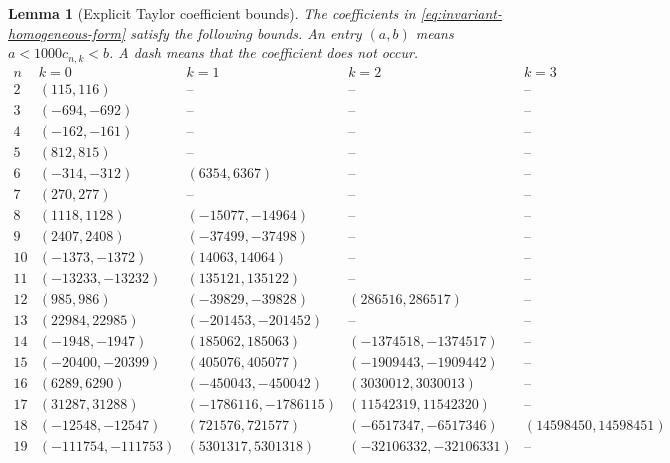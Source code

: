 \documentclass[10pt,twoside]{article}
\theoremstyle{plain}
\newtheorem{lemma}[theorem]{Lemma}
\theoremstyle{definition}
\theoremstyle{remark}
\begin{document}
\begin{lemma}[Explicit Taylor coefficient bounds]
\label{lem:explicit-low-coefficients}
\label{lem:higher-coefficients}
The coefficients in \eqref{eq:invariant-homogeneous-form} satisfy
the following bounds. An entry $(a,b)$ means $a<1000c_{n,k}<b$.
A dash means that the coefficient does not occur.
\begingroup
\footnotesize
\setlength{\arraycolsep}{2pt}
\begin{equation}
\label{eq:taylor-coefficient-bounds}
\begin{array}{r|rrrr}
n&k=0&k=1&k=2&k=3\\
\hline
2&(115,116)&\text{--}&\text{--}&\text{--}\\
3&(-694,-692)&\text{--}&\text{--}&\text{--}\\
4&(-162,-161)&\text{--}&\text{--}&\text{--}\\
5&(812,815)&\text{--}&\text{--}&\text{--}\\
6&(-314,-312)&(6354,6367)&\text{--}&\text{--}\\
7&(270,277)&\text{--}&\text{--}&\text{--}\\
8&(1118,1128)&(-15077,-14964)&\text{--}&\text{--}\\
9&(2407,2408)&(-37499,-37498)&\text{--}&\text{--}\\
10&(-1373,-1372)&(14063,14064)&\text{--}&\text{--}\\
11&(-13233,-13232)&(135121,135122)&\text{--}&\text{--}\\
12&(985,986)&(-39829,-39828)&(286516,286517)&\text{--}\\
13&(22984,22985)&(-201453,-201452)&\text{--}&\text{--}\\
14&(-1948,-1947)&(185062,185063)&(-1374518,-1374517)&\text{--}\\
15&(-20400,-20399)&(405076,405077)&(-1909443,-1909442)&\text{--}\\
16&(6289,6290)&(-450043,-450042)&(3030012,3030013)&\text{--}\\
17&(31287,31288)&(-1786116,-1786115)&(11542319,11542320)&\text{--}\\
18&(-12548,-12547)&(721576,721577)&(-6517347,-6517346)&(14598450,14598451)\\
19&(-111754,-111753)&(5301317,5301318)&(-32106332,-32106331)&\text{--}\\
\end{array}
\end{equation}
\endgroup
\end{lemma}
\end{document}
